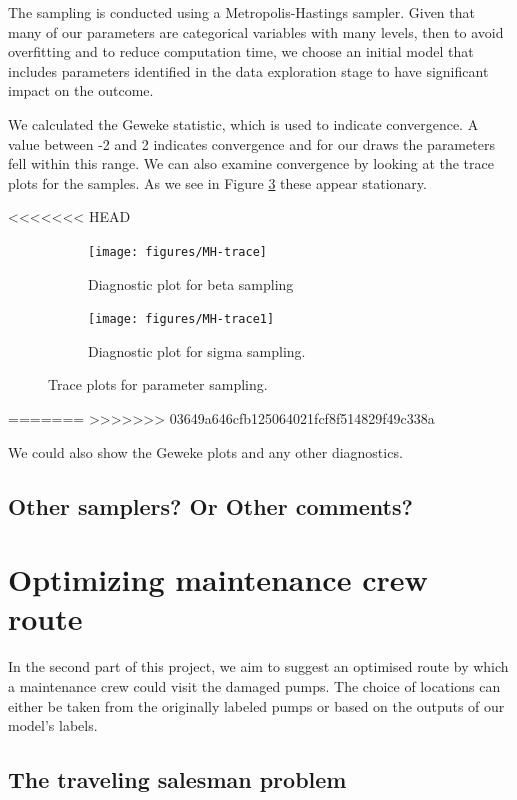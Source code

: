 \documentclass{article} %
\begin{document}
The sampling is conducted using a Metropolis-Hastings sampler. Given that many of our parameters are categorical variables with many levels, then to avoid overfitting and to reduce computation time, we choose an initial model that includes parameters identified in the data exploration stage to have significant impact on the outcome. 

We calculated the Geweke statistic, which is used to indicate convergence. A value between -2 and 2 indicates convergence and for our draws the parameters fell within this range. We can also examine convergence by looking at the trace plots for the samples. As we see in Figure \ref{fig:trace} these appear stationary.

<<<<<<< HEAD
\begin{figure}
  \centering
  \begin{subfigure}[b]{0.45\textwidth}
    \centering
    \texttt{[image: figures/MH-trace]}
    \caption{Diagnostic plot for beta sampling}
    \label{fig:MH-trace}
  \end{subfigure}
  \begin{subfigure}[b]{0.45\textwidth}
    \centering
    \texttt{[image: figures/MH-trace1]}
    \caption{Diagnostic plot for sigma sampling.}
    \label{fig:MH-trace1}
  \end{subfigure}
  \caption{Trace plots for parameter sampling.}
  \label{fig:trace} 
\end{figure}
=======
>>>>>>> 03649a646cfb125064021fcf8f514829f49c338a

We could also show the Geweke plots and any other diagnostics.

\subsection{Other samplers? Or Other comments?}

\section{Optimizing maintenance crew route}

In the second part of this project, we aim to suggest an optimised route by which a maintenance crew could visit the damaged pumps. The choice of locations can either be taken from the originally labeled pumps or based on the outputs of our model's labels. 

\subsection{The traveling salesman problem}
\end{document}
